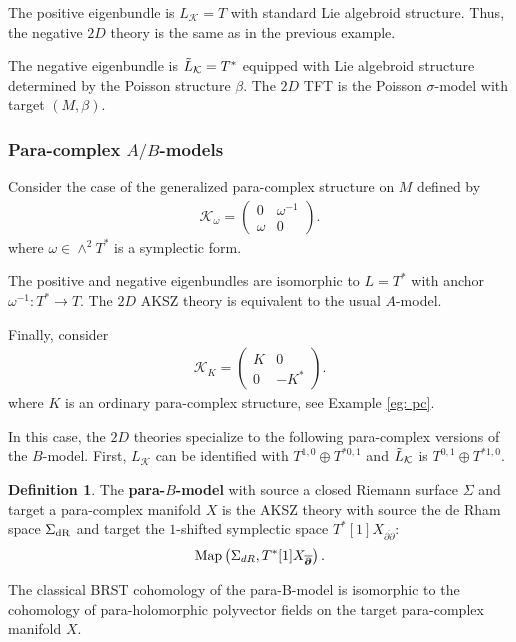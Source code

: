 \documentclass{article}
\newcommand{\KK}{\mathcal{K}}
\newcommand{\p}{\partial}
\newcommand{\pd}{\overline{\p\!\!\!\p}}
\theoremstyle{definition}
\newtheorem{Def}[theorem]{Definition}
\theoremstyle{remark}
\begin{document}
The positive eigenbundle is $L_{\KK} = T$ with standard Lie algebroid structure. 
Thus, the negative $2D$ theory is the same as in the previous example.

The negative eigenbundle is $\Tilde{L}_\KK = T^*$ equipped with Lie algebroid structure determined by the Poisson structure $\beta$. 
The $2D$ TFT is the Poisson $\sigma$-model with target $(M, \beta)$. 

\subsubsection*{Para-complex $A/B$-models}
Consider the case of the generalized para-complex structure on $M$ defined by
\begin{align*}
\KK_\omega =
\begin{pmatrix}
0 & \omega^{-1} \\
\omega & 0
\end{pmatrix}.
\end{align*}
where $\omega \in \wedge^2 T^*$ is a symplectic form.

The positive and negative eigenbundles are isomorphic to $L = T^*$ with anchor $\omega^{-1} : T^* \to T$. 
The $2D$ AKSZ theory is equivalent to the usual $A$-model. 

Finally, consider 
\begin{align*}
\KK_K =
\begin{pmatrix}
K & 0 \\
0 & -K^*
\end{pmatrix}.
\end{align*}
where $K$ is an ordinary para-complex structure, see Example \ref{eg: pc}. 

In this case, the $2D$ theories specialize to the following para-complex versions of the $B$-model.
First, $L_{\KK}$ can be identified with $T^{1,0} \oplus T^{*0,1}$ and $\Tilde{L}_{\KK}$ is $T^{0,1} \oplus T^{*1,0}$. 

\begin{Def}
The {\bf para-$B$-model} with source a closed Riemann surface $\Sigma$ and target a para-complex manifold $X$ is the AKSZ theory with source the de Rham space $\Sigma_{\rm dR}$ and target the $1$-shifted symplectic space $T^*[1] X_{\pd}$:
\[
{\rm Map}\left(\Sigma_{dR}, T^*[1]  X_{\pd}\right) .
\]
\end{Def}

The classical BRST cohomology of the para-B-model is isomorphic to the cohomology of para-holomorphic polyvector fields on the target para-complex manifold $X$.
\end{document}
